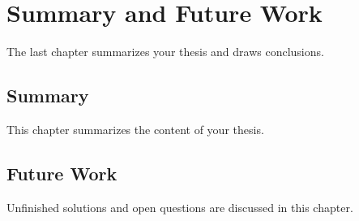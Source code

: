\chapter{Summary and Future Work}\label{secSummary}

The last chapter summarizes your thesis and draws conclusions.


\section{Summary}

This chapter summarizes the content of your thesis.


\section{Future Work}

Unfinished solutions and open questions are discussed in this chapter.